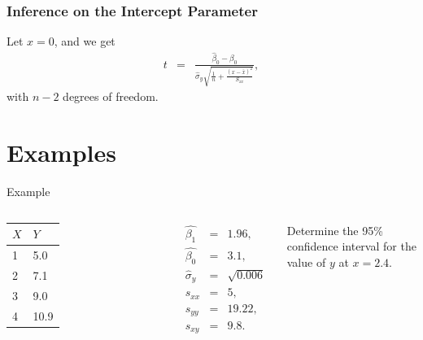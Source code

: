 \begin{frame}
  \frametitle{Inference on the Intercept Parameter}

  Let $x=0$, and we get 
  \begin{eqnarray*}
    t & = & \frac{\hat{\beta}_0 - \beta_0}{
        \hat{\sigma}_y\sqrt{\frac{1}{n}+\frac{(x-\bar{x})^2}{S_{xx}}}},
  \end{eqnarray*}
  with $n-2$ degrees of freedom.
  
\end{frame}

\section{Examples}

\begin{frame}{Example}

    \begin{columns}

      \begin{tabular}{l|l}
        $X$ & $Y$ \\ \hline
        1 & 5.0 \\
        2 & 7.1 \\
        3 & 9.0 \\
        4 & 10.9 \\
      \end{tabular}


      \begin{eqnarray*}
        \hat{\beta_1} & = & 1.96, \\
        \hat{\beta_0} & = & 3.1, \\
        \hat{\sigma}_y & = & \sqrt{0.006} \\
        s_{xx} & = & 5, \\
        s_{yy} & = & 19.22, \\
        s_{xy} & = & 9.8. 
      \end{eqnarray*}



      Determine the 95\% confidence interval for the value of $y$ at $x=2.4$.

    \end{columns}



\end{frame}


